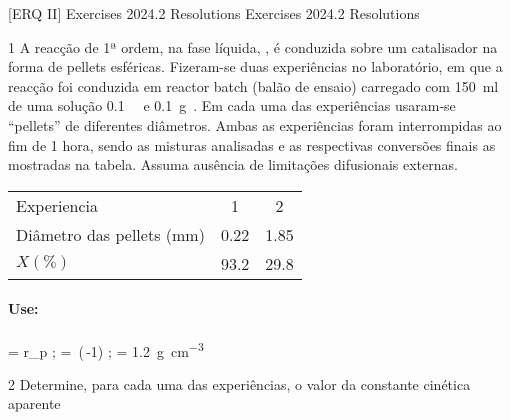 \documentclass[\mainfilename]{subfiles}
\begin{document}

[ERQ II]
{Exercises 2024.2 Resolutions} %
{Exercises 2024.2 Resolutions} %

\begin{questionBox}1{ %
    A reacção de 1ª ordem, na fase líquida, , é conduzida sobre um catalisador na forma de pellets esféricas. Fizeram-se duas experiências no laboratório, em que a reacção foi conduzida em reactor batch (balão de ensaio) carregado com \qty*{150}{\ml} de uma solução \qty*{0.1}{\M{}} e \qty*{0.1}{\g{}}. Em cada uma das experiências usaram-se ``pellets'' de diferentes diâmetros. Ambas as experiências foram interrompidas ao fim de 1 hora, sendo as misturas analisadas e as respectivas conversões finais as mostradas na tabela. Assuma ausência de limitações difusionais externas.
} %
    \begin{center}
        \vspace{1ex}
        \begin{tabular}{l C C}
            \toprule
            
                Experiencia
                & 1 & 2
                \\ Diâmetro das pellets (\unit{\mm})
                & 0.22 & 1.85
                \\ \(X (\%)\)
                & 93.2 & 29.8
            
            \\\bottomrule
        \end{tabular}
    \end{center}

    \paragraph*{Use:}
    \begin{BM}
        \mathemph{\phi}
        = r_p
        ; \qquad
        \mathemph{\eta}
        = 
        \,(\phi\,\coth{\phi}-1)
        ;\qquad
        = \qty*{1.2}{\g.\cm^{-3}}
    \end{BM}
\end{questionBox}

\begin{questionBox}2{ %
    Determine, para cada uma das experiências, o valor da constante cinética aparente
} %
    \answer{}
\end{questionBox}
\end{document}
